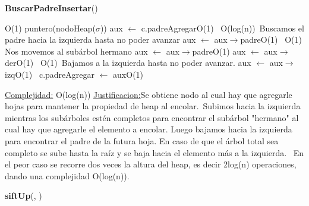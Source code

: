 \begin{Representacion}
\begin{Algoritmos}

\begin{algorithm}[H]{\textbf{BuscarPadreInsertar}()}
	\begin{algorithmic}[1]
		
		\Comment O(1)
			\State puntero(nodoHeap($\sigma$)) aux $\leftarrow$ c.padreAgregar\Comment O(1)
			\,	
			\Comment O(log(n))\,
				\Comment Buscamos el padre hacia la izquierda hasta no poder avanzar
				\State aux $\leftarrow$ aux$\rightarrow$padre\Comment O(1)		
			\EndWhile
			\,			
			\Comment O(1)\,
				\Comment Nos movemos al subárbol hermano
				\State aux $\leftarrow$ aux$\rightarrow$padre\Comment O(1)
				\State aux $\leftarrow$ aux$\rightarrow$der\Comment O(1)
			\EndIf
			\,			
			\Comment O(1)\,
				\Comment Bajamos a la izquierda hasta no poder avanzar.
				\State aux $\leftarrow$ aux$\rightarrow$izq\Comment O(1)
			\EndWhile
			\,
			\State c.padreAgregar $\leftarrow$ aux\Comment O(1)
		\EndIf
		
		\medskip
		\Statex \underline{Complejidad:} O(log(n))
			\Statex \underline{Justificacion:}Se obtiene nodo al cual hay que agregarle hojas para mantener la propiedad de heap al encolar.\,
			     Subimos hacia la izquierda mientras los subárboles estén completos para encontrar el subárbol "hermano" al cual hay que agregarle el elemento a encolar. Luego bajamos hacia la izquierda para encontrar el padre de la futura hoja. En caso de que el árbol total sea completo se sube hasta la raíz y se baja hacia el elemento más a la izquierda.
			\,   En el peor caso se recorre dos veces la altura del heap, es decir 2log(n) operaciones, dando una complejidad O(log(n)). 
	\end{algorithmic}
\end{algorithm}


\begin{algorithm}[H]{\textbf{siftUp}(, )}
	\begin{algorithmic}[1]
		

\end{algorithmic}
\end{algorithm}
\end{Algoritmos}
\end{Representacion}
